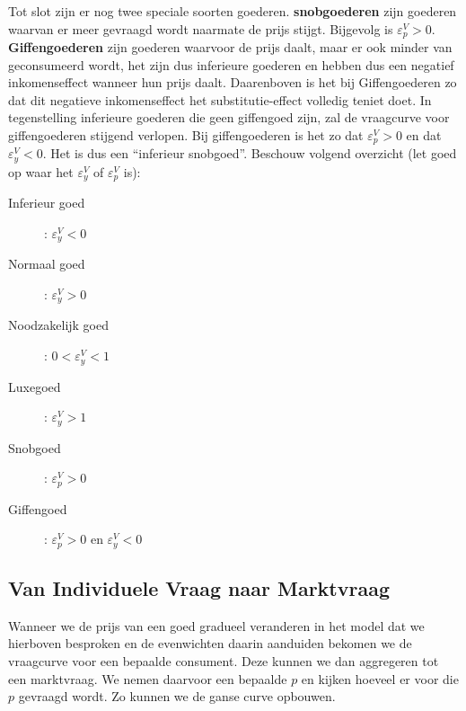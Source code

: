Tot slot zijn er nog twee speciale soorten goederen. \textbf{snobgoederen} zijn goederen waarvan er meer gevraagd wordt naarmate de prijs stijgt. Bijgevolg is $\varepsilon_{p}^V > 0$.
\textbf{Giffengoederen} zijn goederen waarvoor de prijs daalt, maar er ook minder van geconsumeerd wordt, het zijn dus inferieure goederen en hebben dus een negatief inkomenseffect wanneer hun prijs daalt. Daarenboven is het bij Giffengoederen zo dat dit negatieve inkomenseffect het substitutie-effect volledig teniet doet. In tegenstelling inferieure goederen die geen giffengoed zijn, zal de vraagcurve voor giffengoederen stijgend verlopen. Bij giffengoederen is het zo dat $\varepsilon_{p}^V > 0$ en dat $\varepsilon_{y}^V < 0$. Het is dus een ``inferieur snobgoed''. Beschouw volgend overzicht (let goed op waar het $\varepsilon_{y}^V$ of $\varepsilon_{p}^V$ is):
\begin{description}
	\item[Inferieur goed]: $\varepsilon_{y}^V < 0$
    \item[Normaal goed]: $\varepsilon_{y}^V > 0$
    \item[Noodzakelijk goed]: $0 < \varepsilon_{y}^V < 1$
    \item[Luxegoed]: $\varepsilon_{y}^V > 1$
    \item[Snobgoed]: $\varepsilon_{p}^V > 0$
    \item[Giffengoed]: $\varepsilon_{p}^V > 0$ en $\varepsilon_{y}^V < 0$
\end{description}


\subsection{Van Individuele Vraag naar Marktvraag}

Wanneer we de prijs van een goed gradueel veranderen in het model dat we hierboven besproken en de evenwichten daarin aanduiden bekomen we de vraagcurve voor een bepaalde consument. Deze kunnen we dan aggregeren tot een marktvraag. We nemen daarvoor een bepaalde $p$ en kijken hoeveel er voor die $p$ gevraagd wordt. Zo kunnen we de ganse curve opbouwen.
